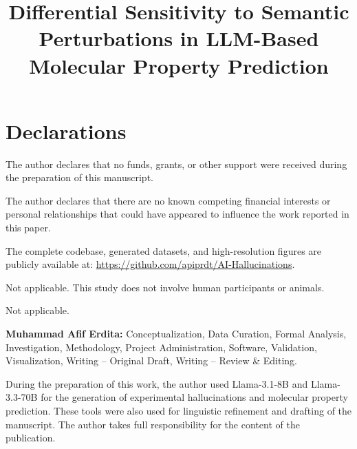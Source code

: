 \documentclass[sn-mathphys]{sn-jnl}
\begin{document}
\title[Semantic Perturbations in LLM Molecular Prediction]{Differential Sensitivity to Semantic Perturbations in LLM-Based Molecular Property Prediction}

\author*[1]{ }

\abstract{

}


\maketitle









\backmatter

\section*{Declarations}

The author declares that no funds, grants, or other support were received during the preparation of this manuscript.

The author declares that there are no known competing financial interests or personal relationships that could have appeared to influence the work reported in this paper.

The complete codebase, generated datasets, and high-resolution figures are publicly available at: \url{https://github.com/apiprdt/AI-Hallucinations}.

Not applicable. This study does not involve human participants or animals.

Not applicable.

\textbf{Muhammad Afif Erdita:} Conceptualization, Data Curation, Formal Analysis, Investigation, Methodology, Project Administration, Software, Validation, Visualization, Writing -- Original Draft, Writing -- Review \& Editing.

During the preparation of this work, the author used Llama-3.1-8B and Llama-3.3-70B for the generation of experimental hallucinations and molecular property prediction. These tools were also used for linguistic refinement and drafting of the manuscript. The author takes full responsibility for the content of the publication.



\newpage
\appendix

\end{document}
